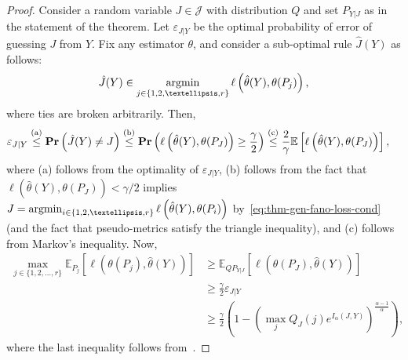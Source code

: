 \documentclass{article}
\numberwithin{theorem}{section}
\numberwithin{example}{section}
\numberwithin{remark}{section}
\numberwithin{definition}{section}
\newcommand{\E}{\mathbb{E}}
\def\Pr{{\rm \mathbf {Pr}}}
\newcommand{\eps}{\varepsilon}
\newcommand{\cJ}{\mathcal{J}}
\newcommand{\argmin}{\operatornamewithlimits{argmin}}
\begin{document}
\begin{proof}
    Consider a random variable $J \in \cJ$ with distribution $Q$ and set $P_{Y|J}$ as in the statement of the theorem. Let $\eps_{J|Y}$ be the optimal probability of error of guessing $J$ from $Y$. Fix any estimator $\theta$, and consider a sub-optimal rule $\hat{J}(Y)$ as follows:
    \begin{align}
        \hat{J}(Y) \in \argmin_{j \in \{1,2,\ldots,r\}} \ell \left( \hat\theta(Y), \theta(P_j) \right), 
    \end{align}
    where ties are broken arbitrarily.
Then,
\begin{align}
    \eps_{J|Y}  & \stackrel{\text{(a)}} \leq \Pr \left( \hat{J}(Y) \neq J \right) 
    \stackrel{\text{(b)}} \leq \Pr \left(  \ell \left( \hat{\theta}(Y), \theta(P_J)  \right) \geq \frac{\gamma}{2} \right) 
     \stackrel{\text{(c)}} \leq \frac{2}{\gamma} \E \left[   \ell \left( \hat{\theta}(Y), \theta(P_J) \right) \right],
\end{align}
where (a) follows from the optimality of $\eps_{J|Y}$, (b) follows from the fact that $ \ell \left( \hat{\theta}(Y), \theta(P_J) \right) < \gamma/2 $ implies $J = \argmin_{i \in \{1,2,\ldots,r\}} \ell \left( \hat\theta(Y), \theta(P_i) \right)$ by~\cref{eq:thm-gen-fano-loss-cond} (and the fact that pseudo-metrics satisfy the triangle inequality), and (c) follows from Markov's inequality. Now,
\begin{align}
    \max_{j \in \{1,2,\ldots, r\}} \E_{P_j} \left[ \ell ( \theta(P_j), \hat{\theta}(Y)) \right] 
    & \geq \E_{Q P_{Y|J}} \left[ \ell ( \theta(P_J), \hat{\theta}(Y)) \right] \\
    & \geq \frac{\gamma}{2} \eps_{J|Y} \\
    & \geq \frac{\gamma}{2} \left(1-\left(\max_j Q_J(j) e^{I_\alpha(J,Y)}\right)^{\frac{\alpha-1}{\alpha}} \right),
\end{align}
where the last inequality follows from~.
\end{proof}


\newpage




\end{document}
